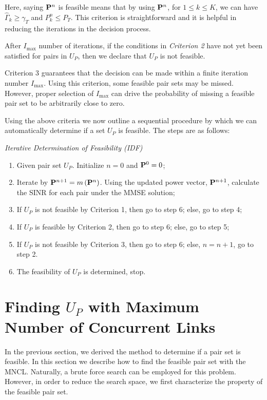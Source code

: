 \documentclass[draftcls,onecolumn,peerview,12pt]{IEEEtran}
\begin{document}
Here, saying ${\rm{\bf P}}^n$ is feasible means that by using
${\rm{\bf P}}^n$, for $1 \leq k \leq K$, we can have
$\hat{\Gamma}_k\geq \gamma_T$ and $P_k^n \leq P_T$. This criterion
is straightforward and it is helpful in reducing the iterations in
the decision process.

\begin{criterion}
After $I_{\max}$ number of iterations, if the conditions in
\textit{Criterion 2} have not yet been satisfied for pairs in $U_P$,
then we declare that $U_P$ is not feasible.
\end{criterion}

Criterion 3 guarantees that the decision can be made within a finite
iteration number $I_{\max}$. Using this criterion, some feasible
pair sets may be missed. However, proper selection of $I_{\max}$ can
drive the probability of missing a feasible pair set to be
arbitrarily close to zero.

Using the above criteria we now outline a sequential procedure by
which we can automatically determine if a set $U_{P}$ is feasible.
The steps are as follows:

\textit{Iterative Determination of Feasibility (IDF)}
\begin{enumerate}
\item Given pair set $U_P$. Initialize $n=0$ and ${\rm{\bf P}}^0 =
0$;

\item Iterate by ${\rm{\bf P}}^{n+1}=m\left({\rm{\bf
P}}^n\right)$. Using the updated power vector, ${\rm{\bf P}}^{n+1}$,
calculate the SINR for each pair under the MMSE solution;

\item If $U_P$ is not feasible by Criterion 1, then go to step 6;
else, go to step 4;

\item If $U_P$ is feasible by Criterion 2, then go to step 6; else,
go to step 5;

\item If $U_P$ is not feasible by Criterion 3, then go to step 6;
else, $n=n+1$, go to step 2.

\item The feasibility of $U_P$ is determined, stop.
\end{enumerate}

\section{Finding $U_{P}$ with Maximum Number of Concurrent Links}
In the previous section, we derived the method to determine if a
pair set is feasible. In this section we describe how to find the
feasible pair set with the MNCL. Naturally, a brute force search can
be employed for this problem. However, in order to reduce the search
space, we first characterize the property of the feasible pair set.
\end{document}

